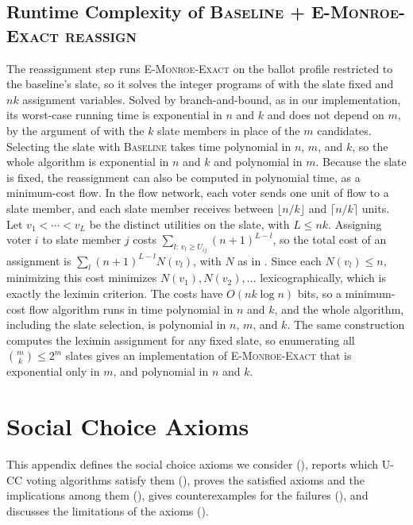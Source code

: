 \documentclass[letterpaper]{article} %
\newcommand{\EExactMonroe}{\textsc{E-Monroe-Exact}}
\newcommand{\Baseline}{\textsc{Baseline}}
\newcommand{\BaselineEMonroeReassign}{\textsc{Baseline + E-Monroe-Exact reassign}}
\begin{document}
\subsection{Runtime Complexity of \BaselineEMonroeReassign{}}
\label{app:baseline-reassign-complexity}
The reassignment step runs \EExactMonroe{} on the ballot profile restricted to the baseline's slate, so it solves the integer programs of  with the slate fixed and $nk$ assignment variables.
Solved by branch-and-bound, as in our implementation, its worst-case running time is exponential in \(n\) and \(k\) and does not depend on \(m\), by the argument of  with the \(k\) slate members in place of the \(m\) candidates.
Selecting the slate with \Baseline{} takes time polynomial in \(n\), \(m\), and \(k\), so the whole algorithm is exponential in \(n\) and \(k\) and polynomial in \(m\).
Because the slate is fixed, the reassignment can also be computed in polynomial time, as a minimum-cost flow.
In the flow network, each voter sends one unit of flow to a slate member, and each slate member receives between $\lfloor n/k\rfloor$ and $\lceil n/k\rceil$ units.
Let $v_1<\cdots<v_L$ be the distinct utilities on the slate, with $L\le nk$.
Assigning voter $i$ to slate member $j$ costs $\sum_{l:\,v_l\ge U_{ij}}(n+1)^{L-l}$, so the total cost of an assignment is $\sum_l (n+1)^{L-l} N(v_l)$, with $N$ as in .
Since each $N(v_l)\le n$, minimizing this cost minimizes $N(v_1),N(v_2),\dots$ lexicographically, which is exactly the leximin criterion.
The costs have $O(nk\log n)$ bits, so a minimum-cost flow algorithm runs in time polynomial in $n$ and $k$, and the whole algorithm, including the slate selection, is polynomial in \(n\), \(m\), and \(k\).
The same construction computes the leximin assignment for any fixed slate, so enumerating all \(\binom{m}{k}\le 2^m\) slates gives an implementation of \EExactMonroe{} that is exponential only in \(m\), and polynomial in \(n\) and \(k\).


\section{Social Choice Axioms}
\label{app:axioms}

This appendix defines the social choice axioms we consider (), reports which \textsc{U-CC} voting algorithms satisfy them (), proves the satisfied axioms and the implications among them (), gives counterexamples for the failures (), and discusses the limitations of the axioms ().
\end{document}
